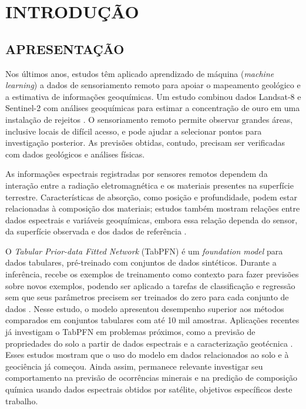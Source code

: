 \chapter{INTRODUÇÃO}
\label{chap:introducao}

\section{APRESENTAÇÃO}

Nos últimos anos, estudos têm aplicado aprendizado de máquina (\textit{machine learning}) a dados de sensoriamento remoto para apoiar o mapeamento geológico e a estimativa de informações geoquímicas. Um estudo combinou dados Landsat-8 e Sentinel-2 com análises geoquímicas para estimar a concentração de ouro em uma instalação de rejeitos \cite{zhang2023}. O sensoriamento remoto permite observar grandes áreas, inclusive locais de difícil acesso, e pode ajudar a selecionar pontos para investigação posterior. As previsões obtidas, contudo, precisam ser verificadas com dados geológicos e análises físicas.

As informações espectrais registradas por sensores remotos dependem da interação entre a radiação eletromagnética e os materiais presentes na superfície terrestre. Características de absorção, como posição e profundidade, podem estar relacionadas à composição dos materiais; estudos também mostram relações entre dados espectrais e variáveis geoquímicas, embora essa relação dependa do sensor, da superfície observada e dos dados de referência \cite{bai2023,zhang2023}.

O \textit{Tabular Prior-data Fitted Network} (TabPFN) é um \textit{foundation model} para dados tabulares, pré-treinado com conjuntos de dados sintéticos. Durante a inferência, recebe os exemplos de treinamento como contexto para fazer previsões sobre novos exemplos, podendo ser aplicado a tarefas de classificação e regressão sem que seus parâmetros precisem ser treinados do zero para cada conjunto de dados \cite{hollmann2025}. Nesse estudo, o modelo apresentou desempenho superior aos métodos comparados em conjuntos tabulares com até 10 mil amostras. Aplicações recentes já investigam o TabPFN em problemas próximos, como a previsão de propriedades do solo a partir de dados espectrais e a caracterização geotécnica \cite{barkov2026,saito2026}. Esses estudos mostram que o uso do modelo em dados relacionados ao solo e à geociência já começou. Ainda assim, permanece relevante investigar seu comportamento na previsão de ocorrências minerais e na predição de composição química usando dados espectrais obtidos por satélite, objetivos específicos deste trabalho.

